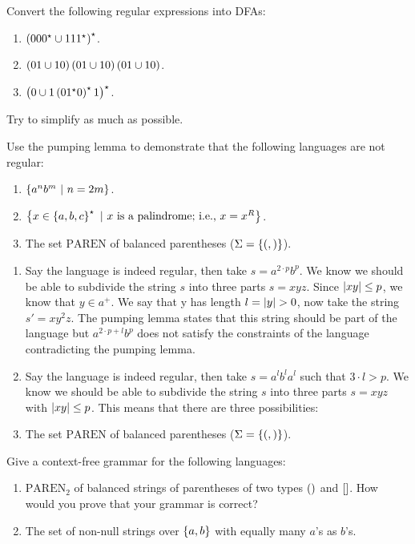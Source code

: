 \documentclass{article}
\begin{document}
\begin{question}
Convert the following regular expressions into DFAs:
\begin{enumerate}
 \item $\left( 000^{\star}\cup 111^{\star} \right)^{\star}$.
 \item $\left( 01\cup 10 \right)\left( 01\cup 10 \right)\left( 01\cup 10 \right)$.
 \item $\left( 0\cup 1\left( 01^{\star}0 \right)^{\star}1 \right)^{\star}$.
\end{enumerate}
Try to simplify as much as possible.
\begin{answer}
\end{answer}
\end{question}
\begin{question}
Use the pumping lemma to demonstrate that the following languages are not regular:
\begin{enumerate}
 \item $\left\{ a^nb^m\ |\ n = 2m \right\}$.
 \item $\left\{ x\in\left\{ a,b,c \right\}^{\star}\ |\ \mbox{$x$ is a palindrome; i.e., $x=x^R$} \right\}$.
 \item The set $\mbox{PAREN}$ of balanced parentheses ($\Sigma=\left\{ (,) \right\}$).
\end{enumerate}
\begin{answer}
\begin{enumerate}
 \item Say the language is indeed regular, then take $s=a^{2\cdot p}b^p$. We know we should be able to subdivide the string $s$ into three parts $s=xyz$. Since $\left|xy\right|\leq p$, we know that $y\in a^+$. We say that y has length $l=\abs{y}>0$, now take the string $s'=xy^2z$. The pumping lemma states that this string should be part of the language but $a^{2\cdot p+l}b^p$ does not satisfy the constraints of the language contradicting the pumping lemma.
 \item Say the language is indeed regular, then take $s=a^lb^la^l$ such that $3\cdot l>p$. We know we should be able to subdivide the string $s$ into three parts $s=xyz$ with $\left|xy\right|\leq p$. This means that there are three possibilities: 
 \item The set $\mbox{PAREN}$ of balanced parentheses ($\Sigma=\left\{ (,) \right\}$).
\end{enumerate}
\end{answer}
\end{question}
\begin{question}
Give a context-free grammar for the following languages:
\begin{enumerate}
 \item $\mbox{PAREN}_2$ of balanced strings of parentheses of two types $\left(  \right)$ and $\left[  \right]$. How would you prove that your grammar is correct?
 \item The set of non-null strings over $\left\{ a,b \right\}$ with equally many $a$'s as $b$'s.
\end{enumerate}
\begin{answer}
\end{answer}
\end{question}
\end{document}
